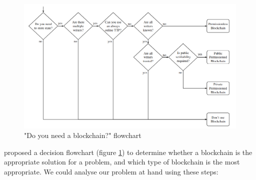 \begin{figure}[!ht] 
    \centering    
    \includegraphics[width=1.0\textwidth]{blockchain_need}
    \caption["Do you need a blockchain?" flowchart]
        {"Do you need a blockchain?" flowchart \citep[p.3]{wust2017you}}
    \label{fig:blockchain_need}
\end{figure}

\citet[p.3]{wust2017you} proposed a decision flowchart (figure \ref{fig:blockchain_need}) to determine whether a blockchain is 
the appropriate solution for a problem, and which type of blockchain is the most appropriate. We could analyse our problem at 
hand using these steps:

